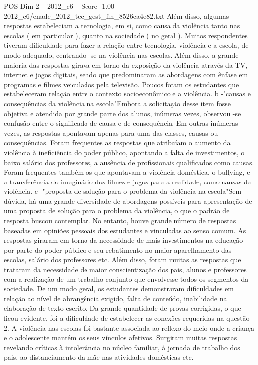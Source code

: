 \begin{textsample}{POS Dim 2 – 2012\_c6 – Score -1.00 – 2012\_c6/enade\_2012\_tec\_gest\_fin\_8526ca4e82.txt}
Além disso, algumas respostas estabeleciam a tecnologia, em si, como causa da violência tanto nas escolas ( em particular ), quanto na sociedade ( no geral ).
Muitos respondentes tiveram dificuldade para fazer a relação entre tecnologia, violência e a escola, de modo adequado, centrando -se na violência nas escolas.
Além disso, a grande maioria das respostas girava em torno da exposição da violência através da TV, internet e jogos digitais, sendo que predominaram as abordagens com ênfase em programas e filmes veiculados pela televisão.
Poucos foram os estudantes que estabeleceram relação entre o contexto socioeconômico e a violência. b -"causas e consequências da violência na escola"Embora a solicitação desse item fosse objetiva e atendida por grande parte dos alunos, inúmeras vezes, observou -se confusão entre o significado de causa e de consequência.
Em outras inúmeras vezes, as respostas apontavam apenas para uma das classes, causas ou consequências.
Foram frequentes as respostas que atribuíam o aumento da violência à ineficiência do poder público, apontando a falta de investimentos, o baixo salário dos professores, a ausência de profissionais qualificados como causas.
Foram frequentes também os que apontavam a violência doméstica, o bullying, e a transferência do imaginário dos filmes e jogos para a realidade, como causas da violência. c -"proposta de solução para o problema da violência na escola"Sem dúvida, há uma grande diversidade de abordagens possíveis para apresentação de uma proposta de solução para o problema da violência, o que o padrão de resposta buscou contemplar.
No entanto, houve grande número de respostas baseadas em opiniões pessoais dos estudantes e vinculadas ao senso comum.
As respostas giraram em torno da necessidade de mais investimentos na educação por parte do poder público e seu rebatimento no maior aparelhamento das escolas, salário dos professores etc.
Além disso, foram muitas as respostas que trataram da necessidade de maior conscientização dos pais, alunos e professores com a realização de um trabalho conjunto que envolvesse todos os segmentos da sociedade.
De um modo geral, os estudantes demonstraram dificuldades em relação ao nível de abrangência exigido, falta de conteúdo, inabilidade na elaboração de texto escrito.
Da grande quantidade de provas corrigidas, o que ficou evidente, foi a dificuldade de estabelecer as conexões requeridas na questão 2.
A violência nas escolas foi bastante associada ao reflexo do meio onde a criança e o adolescente mantém os seus vínculos afetivos.
Surgiram muitas respostas revelando críticas à intolerância no núcleo familiar, à jornada de trabalho dos pais, ao distanciamento da mãe nas atividades domésticas etc.

\end{textsample}
